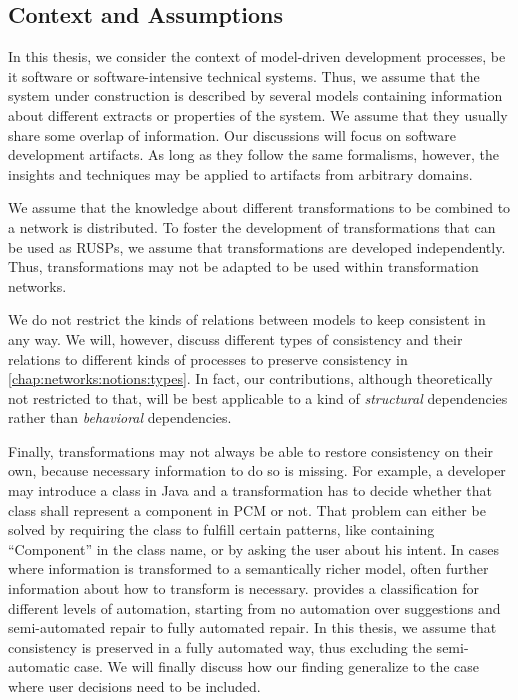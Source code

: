 


\subsection{Context and Assumptions}
\label{chap:introduction:objective:assumptions}

In this thesis, we consider the context of model-driven development processes, be it software or software-intensive technical systems.
Thus, we assume that the system under construction is described by several models containing information about different extracts or properties of the system.
We assume that they usually share some overlap of information.
Our discussions will focus on software development artifacts.
As long as they follow the same formalisms, however, the insights and techniques may be applied to artifacts from arbitrary domains.

We assume that the knowledge about different transformations to be combined to a network is distributed.
To foster the development of transformations that can be used as \glspl{RUSP}, we assume that transformations are developed independently.
Thus, transformations may not be adapted to be used within transformation networks.

We do not restrict the kinds of relations between models to keep consistent  in any way.
We will, however, discuss different types of consistency and their relations to different kinds of processes to preserve consistency in \autoref{chap:networks:notions:types}.
In fact, our contributions, although theoretically not restricted to that, will be best applicable to a kind of \emph{structural} dependencies rather than \emph{behavioral} dependencies.

Finally, transformations may not always be able to restore consistency on their own, because necessary information to do so is missing.
For example, a developer may introduce a class in Java and a transformation has to decide whether that class shall represent a component in \gls{PCM} or not.
That problem can either be solved by requiring the class to fulfill certain patterns, like containing \enquote{Component} in the class name, or by asking the user about his intent.
In cases where information is transformed to a semantically richer model, often further information about how to transform is necessary.
\textcite[p. 57]{kramer2017a} provides a classification for different levels of automation, starting from no automation over suggestions and semi-automated repair to fully automated repair.
In this thesis, we assume that consistency is preserved in a fully automated way, thus excluding the semi-automatic case.
We will finally discuss how our finding generalize to the case where user decisions need to be included.

